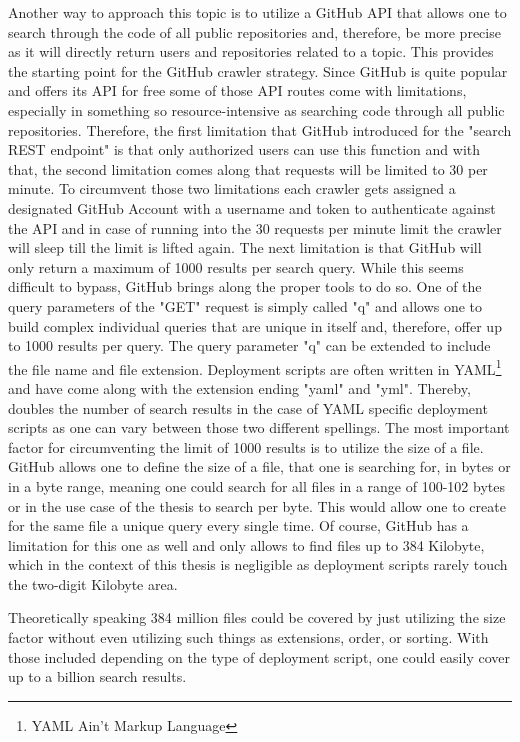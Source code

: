 Another way to approach this topic is to utilize a GitHub API that allows one to search through the code of all public repositories and, therefore, be more precise as it will directly return users and repositories related to a topic. This provides the starting point for the GitHub crawler strategy. Since GitHub is quite popular and offers its API for free some of those API routes come with limitations, especially in something so resource-intensive as searching code through all public repositories.
Therefore, the first limitation that GitHub introduced for the "search REST endpoint" is that only authorized users can use this function and with that, the second limitation comes along that requests will be limited to 30 per minute. To circumvent those two limitations each crawler gets assigned a designated GitHub Account with a username and token to authenticate against the API and in case of running into the 30 requests per minute limit the crawler will sleep till the limit is lifted again.
The next limitation is that GitHub will only return a maximum of 1000 results per search query. While this seems difficult to bypass, GitHub brings along the proper tools to do so. One of the query parameters of the "GET" request is simply called "q" and allows one to build complex individual queries that are unique in itself and, therefore, offer up to 1000 results per query. The query parameter "q" can be extended to include the file name and file extension. Deployment scripts are often written in YAML\footnote{YAML Ain't Markup Language} and have come along with the extension ending "yaml" and "yml". Thereby, doubles the number of search results in the case of YAML specific deployment scripts as one can vary between those two different spellings. The most important factor for circumventing the limit of 1000 results is to utilize the size of a file. GitHub allows one to define the size of a file, that one is searching for, in bytes or in a byte range, meaning one could search for all files in a range of 100-102 bytes or in the use case of the thesis to search per byte. This would allow one to create for the same file a unique query every single time.
Of course, GitHub has a limitation for this one as well and only allows to find files up to 384 Kilobyte, which in the context of this thesis is negligible as deployment scripts rarely touch the two-digit Kilobyte area.

Theoretically speaking 384 million files could be covered by just utilizing the size factor without even utilizing such things as extensions, order, or sorting. With those included depending on the type of deployment script, one could easily cover up to a billion search results.

